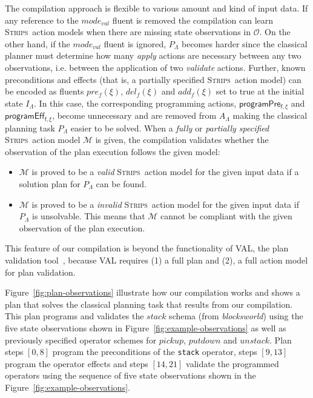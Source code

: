 \documentclass[3p,times]{elsarticle}
\newcommand{\strips}{\textsc{Strips}}     %
\begin{document}
The compilation approach is flexible to various amount and kind of input data. If any reference to the $mode_{val}$ fluent is removed the compilation can learn \strips\ action models when there are missing state observations in $\mathcal{O}$. On the other hand, if the $mode_{val}$ fluent is ignored, $P_{\Lambda}$ becomes harder since the classical planner must determine how many {\em apply} actions are necessary between any two observations, i.e. between the application of two {\em validate} actions.  Further, known preconditions and effects (that is, a partially specified \strips\ action model) can be encoded as fluents $pre_f(\xi)$, $del_f(\xi)$ and $add_f(\xi)$ set to true at the initial state $I_{\Lambda}$. In this case, the corresponding programming actions, $\mathsf{programPre_{f,\xi}}$ and $\mathsf{programEff_{f,\xi}}$, become unnecessary and are removed from $A_{\Lambda}$ making the classical planning task $P_{\Lambda}$ easier to be solved. When a {\em fully} or {\em partially specified} \strips\ action model $\mathcal{M}$ is given, the compilation validates whether the observation of the plan execution follows the given model:
\begin{itemize}
\item $\mathcal{M}$ is proved to be a {\em valid} \strips\ action model for the given input data if a solution plan for $P_{\Lambda}$ can be found.
\item $\mathcal{M}$ is proved to be a {\em invalid} \strips\ action model for the given input data if $P_{\Lambda}$ is unsolvable. This means that $\mathcal{M}$ cannot be compliant with the given observation of the plan execution. 
\end{itemize}
This feature of our compilation is beyond the functionality of VAL, the plan validation tool~\cite{howey2004val}, because VAL requires (1) a full plan and (2), a full action model for plan validation.

Figure~\ref{fig:plan-observations} illustrate how our compilation works and shows a plan that solves the classical planning task that results from our compilation. This plan programs and validates the $stack$ schema (from {\em blocksworld}) using the five state observations shown in Figure~\ref{fig:example-observations} as well as previously specified operator schemes for $pickup$, $putdown$ and $unstack$. Plan steps $[0,8]$ program the preconditions of the {\tt\small stack} operator, steps $[9,13]$ program the operator effects and steps $[14,21]$ validate the programmed operators using the sequence of five state observations shown in the Figure~\ref{fig:example-observations}.
\end{document}
